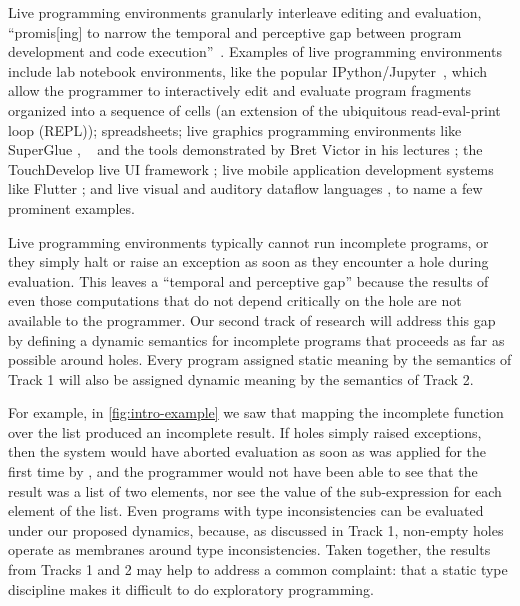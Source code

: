 Live programming environments granularly interleave editing and evaluation,
``promis[ing] to narrow the temporal and perceptive gap 
between program development and code execution''~\cite{burckhardt2013s}.
Examples of live programming environments include {lab notebook environments},
like the popular IPython/Jupyter~\cite{PER-GRA:2007}, which allow the
programmer to interactively edit and evaluate program fragments organized into a
sequence of cells (an extension of the ubiquitous read-eval-print loop (REPL)); spreadsheets; {live graphics programming environments} like SuperGlue \cite{McDirmid:2007}, \sns{}~\cite{sns-pldi,sns-uist} and the tools demonstrated by Bret Victor in his lectures \cite{victor2012inventing}; the TouchDevelop live UI framework \cite{burckhardt2013s}; live mobile application development systems like Flutter \cite{flutter}; and live visual and auditory dataflow languages \cite{DBLP:conf/vl/BurnettAW98}, to name a few prominent examples. 


Live programming environments typically cannot run incomplete programs, or they simply halt or raise an exception as soon as they encounter a hole during evaluation. This leaves a ``temporal and perceptive gap'' because the results of even those computations that do not depend critically on the hole are not available to the programmer. Our second track of research will address this gap by defining a dynamic semantics for incomplete programs that proceeds as far as possible around holes. 
Every program assigned static meaning by the semantics of Track 1 will also be assigned dynamic meaning by the semantics of Track 2.

For example, in \autoref{fig:intro-example} we saw that mapping the incomplete function  over the  list produced an incomplete result. If holes simply raised exceptions, then the system would have aborted evaluation as soon as  was applied for the first time by , and the programmer would not have been able to see that the result was a list of two elements, nor see the value of the sub-expression  for each element  of the  list. Even programs with type inconsistencies can be evaluated under our proposed dynamics, because, as discussed in Track 1, non-empty holes operate as membranes around type inconsistencies. Taken together, the results from Tracks 1 and 2 may help to address a common complaint: that a static type discipline makes it difficult to do exploratory programming. 

